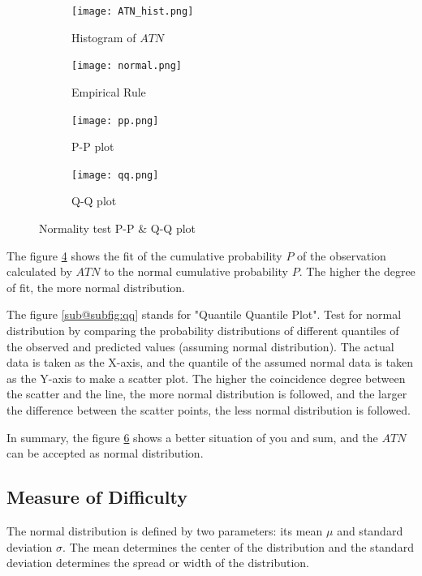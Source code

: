 \documentclass[12pt]{article}  %
\begin{document}
\begin{figure}[htbp]
    \centering
    \begin{subfigure}[b]{.4\textwidth}
    \texttt{[image: ATN\_hist.png]}
    \caption{Histogram of $ATN$}\label{subfig:ATN_hist}
    \end{subfigure}
    \begin{subfigure}[b]{.4\textwidth}
    \texttt{[image: normal.png]}
    \caption{Empirical Rule}\label{subfig:normal}
    \end{subfigure}
    \caption{}\label{fig:nd}
\end{figure}

\begin{figure}[htbp]
    \centering
    \begin{subfigure}[b]{.4\textwidth}
    \texttt{[image: pp.png]}
    \caption{P-P plot}\label{subfig:pp}
    \end{subfigure}
    \begin{subfigure}[b]{.4\textwidth}
    \texttt{[image: qq.png]}
    \caption{Q-Q plot}\label{subfig:qq}
    \end{subfigure}
    \caption{Normality test P-P \& Q-Q plot}\label{fig:ppqq}
\end{figure}

The figure \ref{subfig:pp} shows the fit of the cumulative probability $P$ of the observation calculated by $ATN$ to the normal cumulative probability $P$. The higher the degree of fit, the more normal distribution.

The figure \ref{sub@subfig:qq} stands for "Quantile Quantile Plot". Test for normal distribution by comparing the probability distributions of different quantiles of the observed and predicted values (assuming normal distribution). The actual data is taken as the X-axis, and the quantile of the assumed normal data is taken as the Y-axis to make a scatter plot. The higher the coincidence degree between the scatter and the line, the more normal distribution is followed, and the larger the difference between the scatter points, the less normal distribution is followed.

In summary, the figure \ref{fig:ppqq} shows a better situation of you and sum, and the $ATN$ can be accepted as normal distribution.

\subsection{Measure of Difficulty}

The normal distribution is defined by two parameters: its mean $\mu$ and standard deviation $\sigma$. The mean determines the center of the distribution and the standard deviation determines the spread or width of the distribution.
\end{document}
